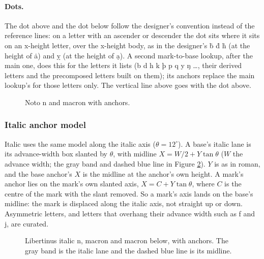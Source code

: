 \documentclass[landscape]{article}
\begin{document}
\paragraph{Dots.}
The dot above and the dot below follow the designer's convention instead of the reference lines:
on a letter with an ascender or descender the dot sits where it sits on an x-height letter, over the x-height body,
as in the designer's ḃ ḋ ḣ (at the height of ȧ) and ỵ (at the height of ạ).
A second mark-to-base lookup, after the main one, does this for the letters it lists (b d h k þ p q y ŋ \ldots, their derived letters and the precomposed letters built on them);
its anchors replace the main lookup's for those letters only. The vertical line above goes with the dot above.

\begin{figure}[htbp]
	\captionsetup{justification=raggedright, singlelinecheck=false}
	\begin{minipage}[t]{0.48\textwidth}
		
		\caption{Libertinus n and macron with anchors.}
		\label{fig:libertinus-geometry}
	\end{minipage}\hfill
	\begin{minipage}[t]{0.48\textwidth}
		
		\caption{Noto n and macron with anchors.}
		\label{fig:noto-geometry}
	\end{minipage}
\end{figure}

\subsubsection*{Italic anchor model}

Italic uses the same model along the italic axis ($\theta = 12^\circ$).
A base's italic lane is its advance-width box slanted by $\theta$, with midline $X = W/2 + Y\tan\theta$ ($W$ the advance width;
the gray band and dashed blue line in Figure \ref{fig:libertinus-italic-geometry}).
$Y$ is as in roman, and the base anchor's $X$ is the midline at the anchor's own height.
A mark's anchor lies on the mark's own slanted axis, $X = C + Y\tan\theta$, where $C$ is the centre of the mark with the slant removed.
So a mark's axis lands on the base's midline: the mark is displaced along the italic axis, not straight up or down.
Asymmetric letters, and letters that overhang their advance width such as f and j, are curated.

\begin{figure}[htbp]
	\captionsetup{justification=raggedright, singlelinecheck=false}
	
	\caption{Libertinus italic n, macron and macron below, with anchors. The gray band is the italic lane and the dashed blue line is its midline.}
	\label{fig:libertinus-italic-geometry}
\end{figure}
\end{document}
